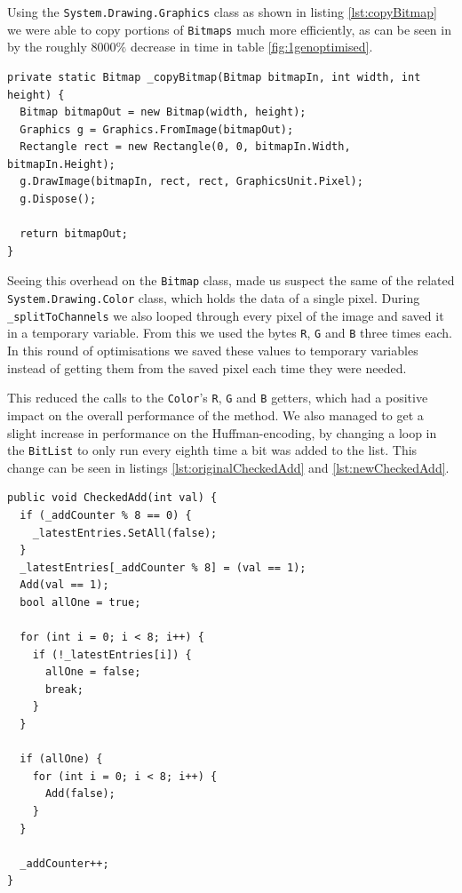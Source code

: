 Using the \lstinline|System.Drawing.Graphics| class as shown in listing \ref{lst:copyBitmap} we were able to copy portions of \lstinline|Bitmap|\lstinline|s| much more efficiently, \citep{MSDNBitmap} as can be seen in by the roughly $8000 \%$ decrease in time in table \ref{fig:1genoptimised}.


\begin{lstlisting}[firstnumber=684,label=lst:copyBitmap,caption={Copying a \lstinline|Bitmap| using the \lstinline|Graphics| class.
\textbf{File:} first\textunderscore  round/CS/JPEGImage.cs.}]
private static Bitmap _copyBitmap(Bitmap bitmapIn, int width, int height) {
  Bitmap bitmapOut = new Bitmap(width, height);
  Graphics g = Graphics.FromImage(bitmapOut);
  Rectangle rect = new Rectangle(0, 0, bitmapIn.Width, bitmapIn.Height);
  g.DrawImage(bitmapIn, rect, rect, GraphicsUnit.Pixel);
  g.Dispose();

  return bitmapOut;
}
\end{lstlisting}

Seeing this overhead on the \lstinline|Bitmap| class, made us suspect the same of the related \lstinline|System.Drawing.Color| class, which holds the data of a single pixel.
During \lstinline|_splitToChannels| we also looped through every pixel of the image and saved it in a temporary variable. 
From this we used the bytes \lstinline|R|, \lstinline|G| and \lstinline|B| three times each. 
In this round of optimisations we saved these values to temporary variables instead of getting them from the saved pixel each time they were needed.

This reduced the calls to the \lstinline|Color|'s \lstinline|R|, \lstinline|G| and \lstinline|B| getters, which had a positive impact on the overall performance of the method.
We also managed to get a slight increase in performance on the Huffman-encoding, by changing a loop in the \lstinline|BitList| to only run every eighth time a bit was added to the list.
This change can be seen in listings \ref{lst:originalCheckedAdd} and \ref{lst:newCheckedAdd}.

\begin{lstlisting}[firstnumber=85,label=lst:originalCheckedAdd, caption={Original \lstinline|CheckedAdd| in \lstinline|BitList|.
Note the for-loop on line 93.
It always runs.
\textbf{File:} unoptimized/CS/BitList.cs.}]
public void CheckedAdd(int val) {
  if (_addCounter % 8 == 0) {
    _latestEntries.SetAll(false);
  }
  _latestEntries[_addCounter % 8] = (val == 1);
  Add(val == 1);
  bool allOne = true;

  for (int i = 0; i < 8; i++) {
    if (!_latestEntries[i]) {
      allOne = false;
      break;
    }
  }

  if (allOne) {
    for (int i = 0; i < 8; i++) {
      Add(false);
    }
  }

  _addCounter++;
}
\end{lstlisting}

